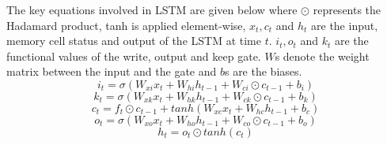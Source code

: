 The key equations involved in LSTM are given below where $\odot$ represents the Hadamard product, tanh is applied element-wise, $x_t, c_t$ and $h_t$ are the input, memory cell status and output of the LSTM at time $t$. $i_t, o_t$ and $k_t$ are the functional values of the write, output and keep gate. $W$s denote the weight matrix between the input and the gate and $b$s are the biases. 
\begin{equation}
    i_t = \sigma \left(W_{xi}x_t + W_{hi}h_{t-1} + W_{ci}\odot c_{t-1} + b_i \right) 
\end{equation}
\begin{equation}
    k_t = \sigma \left(W_{xk}x_t + W_{hk}h_{t-1} + W_{ck}\odot c_{t-1} + b_k \right)
\end{equation}
\begin{equation}
    c_t = f_t\odot c_{t-1} + tanh\left(W_{xc}x_t + W_{hc}h_{t-1} + b_c \right)
\end{equation}
\begin{equation}
    o_t = \sigma \left(W_{xo}x_t + W_{ho}h_{t-1} + W_{co}\odot c_{t-1} + b_o \right)
\end{equation}
\begin{equation}
    h_t = o_t\odot tanh(c_t)
\end{equation}